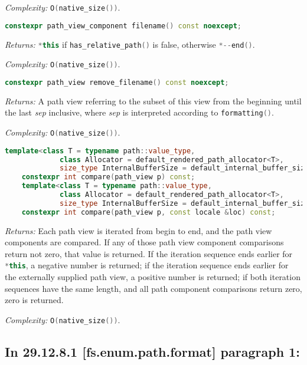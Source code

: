 \documentclass[11pt]{article}
\newcommand{\code}[2][cpp]{\lstinline[language=#1,basicstyle=\small\ttfamily]{#2}}
\newcommand{\desc}[1]{\textit{#1}}
\newcommand{\returns}{\desc{Returns: }}
\newcommand{\complexity}{\desc{Complexity: }}
\newcommand{\tsrefp}[3]{\subsection*{In #2 \textbf{[#1]} paragraph #3:}}
\begin{document}
\complexity \code{O(native_size())}.\\

\begin{lstlisting}[language=cpp]
    constexpr path_view_component filename() const noexcept;
\end{lstlisting}

\returns \code{*this} if \code{has_relative_path()} is false, otherwise \code{*--end()}.

\complexity \code{O(native_size())}.\\

\begin{lstlisting}[language=cpp]
    constexpr path_view remove_filename() const noexcept;
\end{lstlisting}

\returns A path view referring to the subset of this view from the beginning until the last \emph{sep} inclusive, where \emph{sep} is interpreted according to \code{formatting()}.

\complexity \code{O(native_size())}.\\

\begin{lstlisting}[language=cpp]
    template<class T = typename path::value_type,
             class Allocator = default_rendered_path_allocator<T>,
             size_type InternalBufferSize = default_internal_buffer_size>
    constexpr int compare(path_view p) const;
    template<class T = typename path::value_type,
             class Allocator = default_rendered_path_allocator<T>,
             size_type InternalBufferSize = default_internal_buffer_size>
    constexpr int compare(path_view p, const locale &loc) const;
\end{lstlisting}

\returns Each path view is iterated from begin to end, and the path view components are compared. If any of those path view component comparisons return not zero, that value is returned. If the iteration sequence ends earlier for \code{*this}, a negative number is returned; if the iteration sequence ends earlier for the externally supplied path view, a positive number is returned; if both iteration sequences have the same length, and all path component comparisons return zero, zero is returned.

\complexity \code{O(native_size())}.\\

\tsrefp{fs.enum.path.format}{29.12.8.1}{1}

\color{black}
\end{document}
